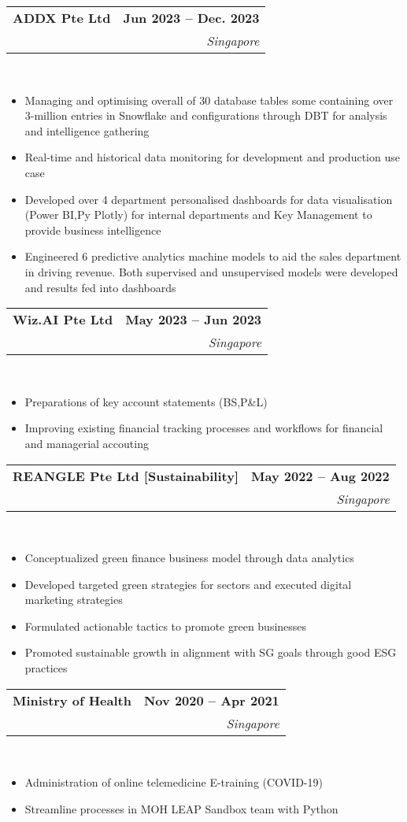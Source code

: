 \documentclass[10pt,a4paper]{article}
\makeatletter
\newcommand{\cvtaglinefirstfontsize}{11}  %
\newcommand{\cvtaglinesecondfontsize}{10} %
\newcommand{\cvbulletfontsize}{10}        %
\newcommand{\cvtagline}[5][1em]{
  \vspace{-1em} %
  \noindent\begin{tabularx}{\textwidth}{@{}Xr@{}}
    {\fontsize{\cvtaglinefirstfontsize}{\cvtaglinefirstfontsize}\selectfont\textbf{#2}} & 
    {\fontsize{\cvtaglinefirstfontsize}{\cvtaglinefirstfontsize}\selectfont\textbf{#3}} \\ %
    {\fontsize{\cvtaglinesecondfontsize}{\cvtaglinesecondfontsize}\selectfont{#4}} & 
    {\fontsize{\cvtaglinesecondfontsize}{\cvtaglinesecondfontsize}\selectfont\textit{#5}} \\ %
  \end{tabularx}
  \\
  \vspace{#1} %
}
\newcommand{\cvbullets}[2][1em]{
  \vspace{-2.1em} %
  {\fontsize{\cvbulletfontsize}{\cvbulletfontsize}\selectfont
    \begin{itemize}[left=0pt,labelsep=1em]
      \setlength\itemsep{0.2em} %
      \setlength\labelwidth{1em} %
      \setlength\parskip{0pt} %
      #2
    \end{itemize}
  }
  \vspace{#1} %
}
\makeatother
\begin{document}
\cvtagline{ADDX Pte Ltd}{Jun 2023 -- Dec. 2023}{Data Analytics Intern $ | $ Supervisor: Yogesh [Data team lead]}{Singapore}

\cvbullets{
  \item Managing and optimising overall of 30 database tables some containing over
  3-million entries in Snowflake and configurations through DBT for analysis and
  intelligence gathering
  \item Real-time and historical data monitoring for development and production use
  case
  \item Developed over 4 department personalised dashboards for data visualisation
  (Power BI,Py Plotly) for internal departments and Key Management to provide
  business intelligence
  \item Engineered 6 predictive analytics machine models to aid the sales department in
  driving revenue. Both supervised and unsupervised models were developed and
  results fed into dashboards }

\cvtagline{Wiz.AI Pte Ltd}{May 2023 -- Jun 2023}{Finance Intern $ | $ Supervisor: Andy Teo [Finance director]}{Singapore}

\cvbullets{
  \item Preparations of key account statements (BS,P\&L)
  \item Improving existing financial tracking processes and workflows for financial and
  managerial accouting }

\cvtagline{REANGLE Pte Ltd [Sustainability]}{May 2022 -- Aug 2022}{Data Analyst Intern}{Singapore}

\cvbullets{
  \item Conceptualized green finance business model through data analytics
  \item Developed targeted green strategies for sectors and executed digital marketing
  strategies
  \item Formulated actionable tactics to promote green businesses
  \item Promoted sustainable growth in alignment with SG goals through good ESG
  practices }

\cvtagline{Ministry of Health}{Nov 2020 -- Apr 2021}{Engagement \& Strategy Intern $ | $ Supervisor: Weng Chee}{Singapore}

\cvbullets{
  \item Administration of online telemedicine E-training (COVID-19)
  \item Streamline processes in MOH LEAP Sandbox team with Python }
\end{document}
